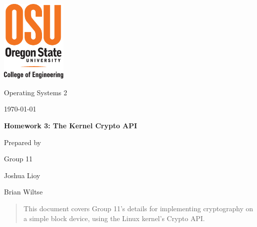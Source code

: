 \documentclass[letterpaper, onecolumn, draftclsnofoot, 10pt, compsoc]{IEEEtran}
\def \GroupNumber{11}
\def \GroupMemberOne{Joshua Lioy}
\def \GroupMemberTwo{Brian Wiltse}
\begin{document}
\begin{titlepage}
    \begin{singlespace}
    	\includegraphics[height=4cm]{coe_v_spot1}
        \hfill 
        \par\vspace{.2in}
        \centering
        \scshape{
            \huge Operating Systems 2 \par
            {\large\today}\par
            \vspace{.5in}
            \textbf{\Huge Homework 3: The Kernel Crypto API}\par
            \vfill
            \vspace{5pt}
            {\large Prepared by }\par
            Group \GroupNumber\par
            \vspace{5pt}
            {\Large
                \GroupMemberOne\par
                \GroupMemberTwo\par
            }
            \vspace{20pt}
        }
        \begin{abstract}
        This document covers Group 11's details for implementing cryptography on a simple block device, using the Linux kernel's Crypto API.
        \end{abstract}     
    \end{singlespace}
\end{titlepage}

\newpage
{}
\tableofcontents

\newpage
\end{document}
